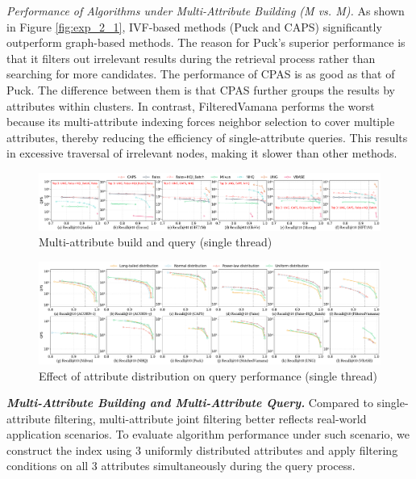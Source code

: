 \documentclass[sigconf, nonacm]{acmart}
\begin{document}
	
	
	\textit{Performance of Algorithms under Multi-Attribute Building (M vs. M).}  
	As shown in Figure \ref{fig:exp_2_1}, IVF-based methods (Puck and CAPS) significantly outperform graph-based methods. The reason for Puck's superior performance is that it filters out irrelevant results during the retrieval process rather than searching for more candidates. The performance of CPAS is as good as that of Puck. The difference between them is that CPAS further groups the results by attributes within clusters. In contrast, FilteredVamana performs the worst because its multi-attribute indexing forces neighbor selection to cover multiple attributes, thereby reducing the efficiency of single-attribute queries. This results in excessive traversal of irrelevant nodes, making it slower than other methods.
	
	
	\begin{figure}
		\centering
		\setlength{\abovecaptionskip}{0.1cm}
		\setlength{\belowcaptionskip}{-0.4cm}
		\includegraphics[width=\textwidth]{figures/exp/exp_4_1_MultiLabel_1thread.pdf}
		\caption{Multi-attribute build and query (single thread)}
		\label{fig:exp_4_1_MultiLabel_1thread}
	\end{figure}
	
	\begin{figure}
		\centering
		\setlength{\abovecaptionskip}{0.1cm}
		\setlength{\belowcaptionskip}{-0.4cm}
		\includegraphics[width=\textwidth]{figures/exp/exp_3_1.pdf}
		\caption{Effect of attribute distribution on query performance (single thread)}
		\label{fig:exp_3_1}
	\end{figure}
	
	
	
	
	
	\textit{\textbf{Multi-Attribute Building and Multi-Attribute Query.}}  
	Compared to single-attribute filtering, multi-attribute joint filtering better reflects real-world application scenarios. To evaluate algorithm performance under such scenario, we construct the index using 3 uniformly distributed attributes and apply filtering conditions on all 3 attributes simultaneously during the query process.
	
\end{document}
